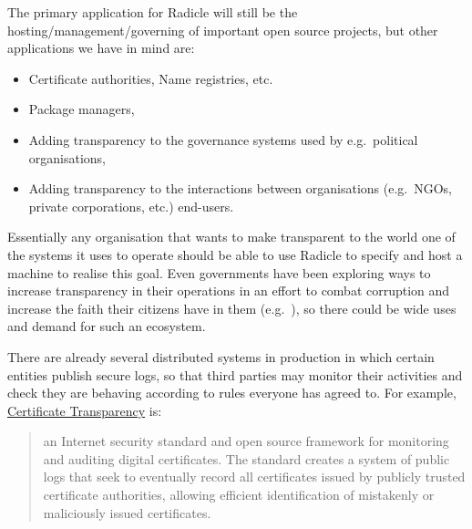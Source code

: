 \documentclass[a4paper, oneside, 10pt]{amsart}
\begin{document}
The primary application for Radicle will still be the
hosting/management/governing of important open source projects, but other
applications we have in mind are:
\begin{itemize}
\item
  Certificate authorities, Name registries, etc.
\item
  Package managers,
\item
  Adding transparency to the governance systems used by e.g.~political
  organisations,
\item
  Adding transparency to the interactions between organisations
  (e.g.~NGOs, private corporations, etc.) end-users.
\end{itemize}

Essentially any organisation that wants to make transparent to the world one of
the systems it uses to operate should be able to use Radicle to specify and host
a machine to realise this goal. Even governments have been exploring ways to
increase transparency in their operations in an effort to combat corruption and
increase the faith their citizens have in them
(e.g.~\cite{ukraine-transparency}), so there could be wide uses and demand for
such an ecosystem.

There are already several distributed systems in production in which
certain entities publish secure logs, so that third parties may monitor
their activities and check they are behaving according to rules everyone
has agreed to. For example,
\href{https://en.wikipedia.org/wiki/Certificate_Transparency}{Certificate
Transparency} is:
\begin{quote}
an Internet security standard and open source framework for monitoring and
auditing digital certificates. The standard creates a system of public logs that
seek to eventually record all certificates issued by publicly trusted
certificate authorities, allowing efficient identification of mistakenly or
maliciously issued certificates.
\end{quote}
\end{document}
